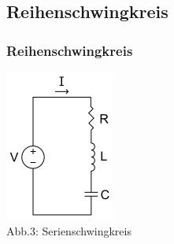 \subsection*{Reihen\-schwing\-kreis}
\begin{frame}
\frametitle{Reihenschwingkreis}
\begin{center}
	\begin{minipage}{0.4\textwidth}
	\includegraphics[height=.5\textheight,width=\textwidth,keepaspectratio]{a04/Serirenschw.png}\\
	\tiny{Abb.3: Serienschwingkreis \cite{wmen}}
	\end{minipage}
	\begin{minipage}{0.4\textwidth}

\end{minipage}
\end{center}
\end{frame}

